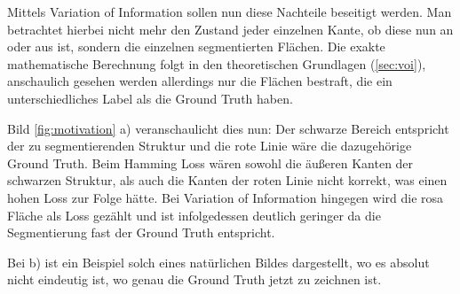 Mittels Variation of Information sollen nun diese Nachteile beseitigt werden. Man betrachtet hierbei nicht mehr den Zustand jeder einzelnen Kante, ob diese nun an oder aus ist, sondern  die einzelnen segmentierten Flächen. Die exakte mathematische Berechnung folgt in den theoretischen Grundlagen (\ref{sec:voi}), anschaulich gesehen werden allerdings nur die Flächen bestraft, die ein unterschiedliches Label als die Ground Truth haben.

Bild \ref{fig:motivation} a) veranschaulicht dies nun: Der schwarze Bereich entspricht der zu segmentierenden Struktur und die rote Linie wäre die dazugehörige Ground Truth. Beim Hamming Loss wären sowohl die äußeren Kanten der schwarzen Struktur, als auch die Kanten der roten Linie nicht korrekt, was einen hohen Loss zur Folge hätte. Bei Variation of Information hingegen wird die rosa Fläche als Loss gezählt und ist infolgedessen deutlich geringer da die Segmentierung fast der Ground Truth entspricht.

Bei b) ist ein Beispiel solch eines natürlichen Bildes dargestellt, wo es absolut nicht eindeutig ist, wo genau die Ground Truth jetzt zu zeichnen ist.


\begin{figure}[H]
	\centering
	\hfill
\end{figure}
\vspace{-0.5cm}
\label{fig:motivation}


